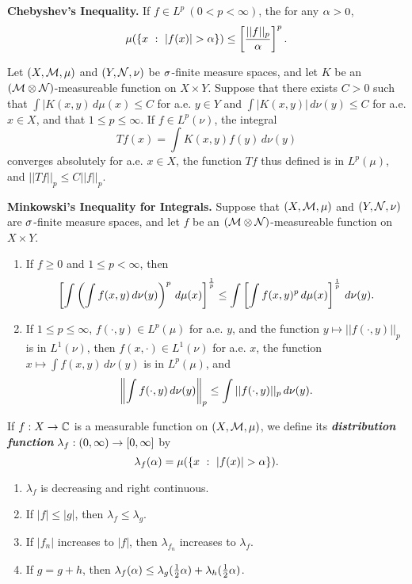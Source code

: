 \textbf{Chebyshev's Inequality.} If $f\in L^p\ (0<p<\infty)$, the for any $\alpha > 0$, 
\[\mu(\{x\ :\ |f(x)| > \alpha\}) \leq \left[\frac{||f||_p}{\alpha}\right]^p.\]

\vs
\setcounter{thm}{17}

\begin{thm}
Let $(X,\mathcal{M},\mu)$ and $(Y,\mathcal{N},\nu)$ be $\sigma$-finite measure spaces, and let $K$ be an $(\mathcal{M}\otimes\mathcal{N})$-measureable function on $X\times Y$. Suppose that there exists $C > 0$ such that $\int|K(x,y)\,d\mu(x) \leq C$ for a.e. $y\in Y$ and $\int |K(x,y)|\,d\nu(y)\leq C$ for a.e. $x\in X$, and that $1\leq p\leq \infty$. If $f\in L^p(\nu)$, the integral
\[Tf(x) = \int K(x,y)f(y)\, d\nu(y)\]
converges absolutely for a.e. $x\in X$, the function $Tf$ thus defined is in $L^p(\mu)$, and $||Tf||_p\leq C||f||_p$.
\end{thm}

\vs

\textbf{Minkowski's Inequality for Integrals.} Suppose that $(X,\mathcal{M},\mu)$ and $(Y,\mathcal{N},\nu)$ are $\sigma$-finite measure spaces, and let $f$ be an $(\mathcal{M}\otimes\mathcal{N})$-measureable function on $X\times Y$.
\begin{enumerate}
    \item If $f\geq 0$ and $1 \leq p < \infty$, then
    \[\left[\int\left( \int f(x,y)\,d\nu(y)\right)^p\,d\mu(x)\right]^\frac{1}{p}\leq\int\left[\int f(x,y)^p\,d\mu(x)\right]^\frac{1}{p}\,d\nu(y).\]
    \item If $1 \leq p \leq \infty$, $f(\cdot, y)\in L^p(\mu)$ for a.e. $y$, and the function $y\mapsto ||f(\cdot, y)||_p$ is in $L^1(\nu)$, then $f(x,\cdot)\in L^1(\nu)$ for a.e. $x$, the function $x\mapsto \int f(x,y)\,d\nu(y)$ is in $L^p(\mu)$, and 
    \[\left\|\int f(\cdot,y)\,d\nu(y)\right\|_p\leq\int ||f(\cdot, y)||_p\,d\nu(y).\]
\end{enumerate}

\vs

\dfn If $f:X\rightarrow \mathbb{C}$ is a measurable function on $(X, \mathcal{M}, \mu)$, we define its \textbf{\textit{distribution function}} $\lambda_f:(0,\infty) \rightarrow [0,\infty]$ by
\[\lambda_f(\alpha) = \mu(\{x\ :\ |f(x)| > \alpha\}).\]

\vs
\setcounter{thm}{21}
\newpage

\begin{prop}\nl
\begin{enumerate}
    \item $\lambda_f$ is decreasing and right continuous.
    \item If $|f| \leq |g|$, then $\lambda_f\leq \lambda_g$.
    \item If $|f_n|$ increases to $|f|$, then $\lambda_{f_n}$ increases to $\lambda_f$.
    \item If $g = g + h$, then $\lambda_f(\alpha) \leq \lambda_g(\frac{1}{2}\alpha) + \lambda_h(\frac{1}{2}\alpha)$.
\end{enumerate}
\end{prop}

